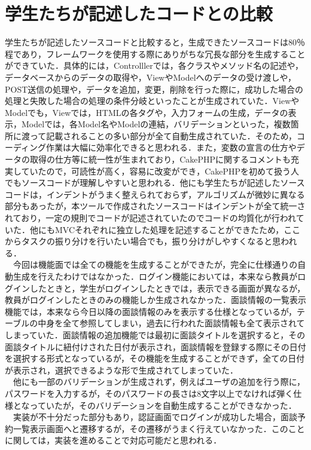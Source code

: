 \documentclass{funthesis}
\begin{document}
\section{学生たちが記述したコードとの比較}
学生たちが記述したソースコードと比較すると，生成できたソースコードは80％程であり，フレームワークを使用する際にありがちな冗長な部分を生成することができていた．具体的には，Controlllerでは，各クラスやメソッド名の記述や，データベースからのデータの取得や，ViewやModelへのデータの受け渡しや，POST送信の処理や，データを追加，変更，削除を行った際に，成功した場合の処理と失敗した場合の処理の条件分岐といったことが生成されていた．ViewやModelでも，Viewでは，HTMLの各タグや，入力フォームの生成，データの表示，Modelでは，各Model名やModelの連結，バリデーションといった，複数箇所に渡って記載されることの多い部分が全て自動生成されていた．そのため，コーディング作業は大幅に効率化できると思われる．また，変数の宣言の仕方やデータの取得の仕方等に統一性が生まれており，CakePHPに関するコメントも充実していたので，可読性が高く，容易に改変ができ，CakePHPを初めて扱う人でもソースコードが理解しやすいと思われる．他にも学生たちが記述したソースコードは，インデントがうまく整えられておらず，アルゴリズムが微妙に異なる部分もあったが，本ツールで作成されたソースコードはインデントが全て統一されており，一定の規則でコードが記述されていたのでコードの均質化が行われていた．他にもMVCそれぞれに独立した処理を記述することができたため，ここからタスクの振り分けを行いたい場合でも，振り分けがしやすくなると思われる．\\
　今回は機能面では全ての機能を生成することができたが，完全に仕様通りの自動生成を行えたわけではなかった．ログイン機能においては，本来なら教員がログインしたときと，学生がログインしたときでは，表示できる画面が異なるが，教員がログインしたときのみの機能しか生成されなかった．面談情報の一覧表示機能では，本来なら今日以降の面談情報のみを表示する仕様となっているが，テーブルの中身を全て参照してしまい，過去に行われた面談情報も全て表示されてしまっていた．面談情報の追加機能では最初に面談タイトルを選択すると，その面談タイトルに紐付けされた日付が表示され，面談情報を登録する際にその日付を選択する形式となっているが，その機能を生成することができず，全ての日付が表示され，選択できるような形で生成されてしまっていた．\\
　他にも一部のバリデーションが生成されず，例えばユーザの追加を行う際に，パスワードを入力するが，そのパスワードの長さは8文字以上でなければ弾く仕様となっていたが，そのバリデーションを自動生成することができなかった．\\
　実装が不十分だった部分もあり，認証画面でログインが成功した場合，面談予約一覧表示画面へと遷移するが，その遷移がうまく行えていなかった．このことに関しては，実装を進めることで対応可能だと思われる．
\end{document}
